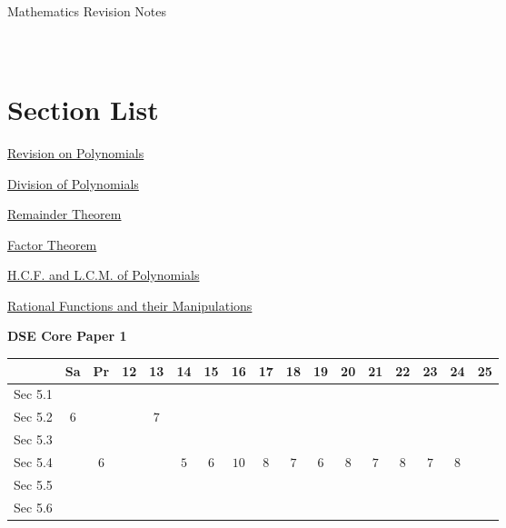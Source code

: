 \documentclass[12pt, a4paper]{article}
\begin{document}
\newpage
\newpage
\thispagestyle{empty}
\begin{center}
Mathematics Revision Notes\\\vspace{1cm}
\\\vspace{1cm}
{\fontsize{24pt}{24pt}\selectfont {More about Polynomials}} \\\vspace{1cm}
\label{chapter:S4-5}

\end{center}
\vspace{0.5cm}
\hline
\section*{Section List}
\begin{enumx}[label=Sec 5.\arabic*\ ]
\item \hyperref[section:4-5-1]{Revision on Polynomials }
\item \hyperref[section:4-5-2]{Division of Polynomials}
\item \hyperref[section:4-5-3]{Remainder Theorem}
\item \hyperref[section:4-5-4]{Factor Theorem}
\item \hyperref[section:4-5-5]{H.C.F. and L.C.M. of Polynomials \NF}
\item \hyperref[section:4-5-6]{Rational Functions and their Manipulations \NF}
\end{enumx}
\begin{absolutelynopagebreak}
\begin{center}
\textbf{DSE Core Paper 1}
\end{center}
\begin{center}
\begin{tabular}{|l|c|c|c|c|c|c|c|c|c|c|c|c|c|c|c|c|}
\hline
        & Sa & Pr & 12 & 13 & 14 & 15 & 16 & 17 & 18 & 19 & 20 & 21 & 22 & 23 & 24 & 25 \\\hline\hline
Sec 5.1 &  &  &  &  &  &  &  &  &  &  &  &  &  &  &  &  \\\hline
Sec 5.2 &  $6$ &  &  &  $7$ &  &  &  &  &  &  &  &  &  &  &  &  \\\hline
Sec 5.3 &  &  &  &  &  &  &  &  &  &  &  &  &  &  &  &  \\\hline
Sec 5.4 &  &  $6$ &  &  &  $5$ &  $6$ &  $10$ &  $8$ &  $7$ &  $6$ &  $8$ &  $7$ &  $8$ &  $7$ &  $8$ &  \\\hline
Sec 5.5 &  &  &  &  &  &  &  &  &  &  &  &  &  &  &  &  \\\hline
Sec 5.6 &  &  &  &  &  &  &  &  &  &  &  &  &  &  &  &  \\\hline
\end{tabular}
\end{center}
\end{absolutelynopagebreak}
\end{document}

